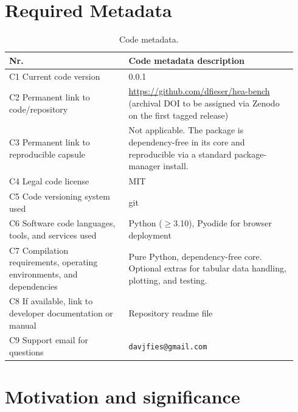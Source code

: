 \documentclass[review,times,nonatbib]{elsarticle}
\begin{document}
\section*{Required Metadata}

\begin{table}[h]
\caption{Code metadata.}
\centering
\begin{tabular}{p{0.39\linewidth} p{0.55\linewidth}}
\toprule
\textbf{Nr.} & \textbf{Code metadata description} \\
\midrule
C1 Current code version & 0.0.1 \\
C2 Permanent link to code/repository &
  \url{https://github.com/dfieser/hea-bench} (archival DOI to be
  assigned via Zenodo on the first tagged release) \\
C3 Permanent link to reproducible capsule & Not applicable. The
  package is dependency-free in its core and reproducible via a
  standard package-manager install. \\
C4 Legal code license & MIT \\
C5 Code versioning system used & git \\
C6 Software code languages, tools, and services used & Python
  ($\geq$3.10), Pyodide for browser deployment \\
C7 Compilation requirements, operating environments, and dependencies
  & Pure Python, dependency-free core. Optional extras for tabular
  data handling, plotting, and testing. \\
C8 If available, link to developer documentation or manual &
  Repository readme file \\
C9 Support email for questions & \texttt{davjfies@gmail.com} \\
\bottomrule
\end{tabular}
\end{table}

\section{Motivation and significance}
\end{document}
